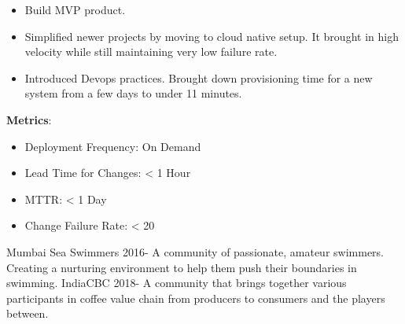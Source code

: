 \documentclass[11pt]{spidercv}
\begin{document}
\begin{MainPart}
{            \begin{DoubleColumns}
	            \begin{itemize}
	            \item[\ding{51}]Build MVP product.\\ 
            	\item[\ding{51}]Simplified newer projects by moving to cloud native setup. It brought in high velocity while still maintaining very low failure rate.\\
            	\item[\ding{51}]Introduced Devops practices. Brought down provisioning time for a new system from a few days to under 11 minutes.
            	\end{itemize}
            \nextcolumn
            	\textbf{Metrics}: \\
            		\begin{itemize}
	            		\item Deployment Frequency: On Demand \\
            			\item Lead Time for Changes: < 1 Hour \\
            		    \item MTTR: < 1 Day \\
            			\item Change Failure Rate: < 20%
	            	\end{itemize}
    		\end{DoubleColumns}
        }

    
    \Experience
        {\ColorHighlight}
		{Mumbai Sea Swimmers}
		{}
		{2016-\faUndo}
        {   
            A community of passionate, amateur swimmers. Creating a nurturing environment to help them push their boundaries in swimming. 
        }
	\Experience
        {\ColorHighlight}
		{IndiaCBC}
		{}
		{2018-\faUndo}
        {   
            A community that brings together various participants in coffee value chain from producers to consumers and the players between.
        }
        
    \end{MainPart}

    
\end{document}
